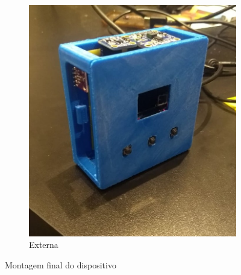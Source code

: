 \documentclass[../monografia.tex]{subfiles}
\begin{document}
\begin{figure}[h]
\begin{subfigure}{0.5\textwidth}
		\includegraphics[width=\textwidth]{montagem-final.jpg}
		\caption{Externa}
		\label{fig:externa}
	\end{subfigure}
	\caption{Montagem final do dispositivo}
	\label{fig:mecanicas}
\end{figure}
\end{document}
